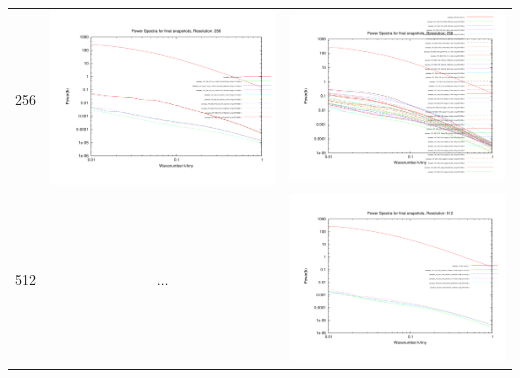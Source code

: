 \begin{itemize}
\begin{table}
\begin{tabular}{l|c|c}
 256 & \includegraphics[scale=0.2]{analysis/powerspectra/fin_powspec_combined_256_h70.pdf} & \includegraphics[scale=0.2]{analysis/powerspectra/fin_powspec_combined_256_h100.pdf} \\
 512 & $\dots$ & \includegraphics[scale=0.2]{analysis/powerspectra/fin_powspec_combined_512_h100.pdf} \\


\end{tabular}
\end{table}
\end{itemize}

